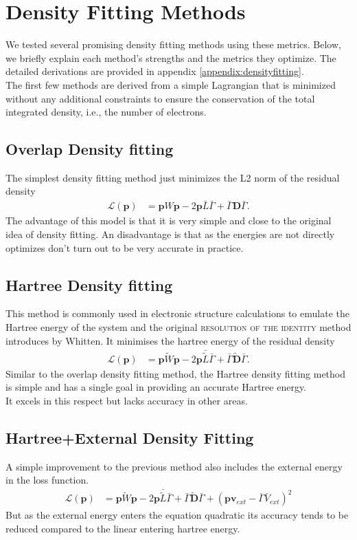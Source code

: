\section{Density Fitting Methods}
We tested several promising density fitting methods using these metrics. Below, we briefly explain each method’s strengths and the metrics they optimize. The detailed derivations are provided in appendix \ref{appendix:densityfitting}.\\

The first few methods are derived from a simple Lagrangian that is minimized without any additional constraints to ensure the conservation of the total integrated density, i.e., the number of electrons.
\subsection{Overlap Density fitting}
The simplest density fitting method just minimizes the L2 norm of the residual density
\begin{align} \label{overlap_eq}
        \mathcal{L}(\mathbf{p}) &= \mathbf{p} W \mathbf{p} - 2 \mathbf{p}\bar { L} \bar\Gamma + \bar\Gamma \mathbf{D}\bar\Gamma.
\end{align}
The advantage of this model is that it is very simple and close to the original idea of density fitting. An disadvantage is that as the energies are not directly optimizes don't turn out to be very accurate in practice.
\subsection{Hartree Density fitting}
This method is commonly used in electronic structure calculations to emulate the Hartree energy of the system and the original \textsc{resolution of the identity} method introduces by Whitten\cite{whitten1973}. It minimises the hartree energy of the residual density
\begin{align}
        \mathcal{L}(\mathbf{p}) &= \mathbf{p} \tilde{W} \mathbf{p} - 2 \mathbf{p}\bar {\tilde L} \bar\Gamma + \bar\Gamma \tilde{\mathbf{D}}\bar\Gamma.
\end{align}
Similar to the overlap density fitting method, the Hartree density fitting method is simple and has a single goal in providing an accurate Hartree energy.\\
It excels in this respect but lacks accuracy in other areas.
\subsection{Hartree+External Density Fitting} \label{hartreeexternal}
A simple improvement to the previous method also includes the external energy in the loss function.
\begin{align}\label{true_df}
        \mathcal{L}(\mathbf{p}) &= \mathbf{p} \tilde{W} \mathbf{p} - 2 \mathbf{p}\bar {\tilde L} \bar\Gamma + \bar\Gamma \tilde{\mathbf{D}}\bar\Gamma + (\mathbf{p}\mathbf{v}_{ext}-\bar\Gamma \bar{V}_{ext})^2
\end{align}
But as the external energy enters the equation quadratic its accuracy tends to be reduced compared to the linear entering hartree energy.
